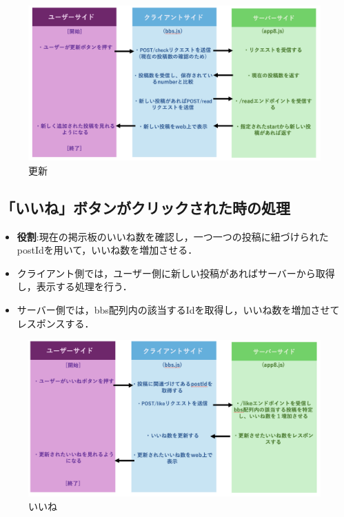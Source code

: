 \documentclass[uplatex,dvipdfmx]{jsarticle}
\begin{document}
\begin{figure}[h]
    \centering
    \includegraphics[width=14cm]{更新.png}
    \caption{更新}
    \label{fig:更新}
\end{figure}

\clearpage
\subsection{「いいね」ボタンがクリックされた時の処理}
\begin{itemize}
    \item \textbf{役割}:現在の掲示板のいいね数を確認し，一つ一つの投稿に紐づけられたpostIdを用いて，いいね数を増加させる．
    \item クライアント側では，ユーザー側に新しい投稿があればサーバーから取得し，表示する処理を行う．
    \item サーバー側では，bbs配列内の該当するIdを取得し，いいね数を増加させてレスポンスする．
\end{itemize}

\begin{figure}[h]
    \centering
    \includegraphics[width=14cm]{いいね.png}
    \caption{いいね}
    \label{fig:いいね}
\end{figure}
\end{document}
